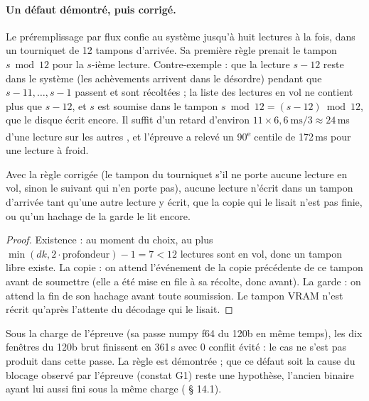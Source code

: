 \paragraph{Un défaut démontré, puis corrigé.} Le préremplissage par flux confie au système jusqu'à huit lectures à la fois, dans un tourniquet de 12 tampons d'arrivée. Sa première règle prenait le tampon $s \bmod 12$ pour la $s$-ième lecture. Contre-exemple : que la lecture $s - 12$ reste dans le système (les achèvements arrivent dans le désordre) pendant que $s - 11, \ldots, s - 1$ passent et sont récoltées ; la liste des lectures en vol ne contient plus que $s - 12$, et $s$ est soumise dans le tampon $s \bmod 12 = (s - 12) \bmod 12$, que le disque écrit encore. Il suffit d'un retard d'environ $11 \times 6{,}6~\text{ms}/3 \approx 24$\,ms d'une lecture sur les autres \calc, et l'épreuve a relevé un 90\textsuperscript{e} centile de 172\,ms pour une lecture à froid.

\begin{lemme}\label{lem:t2o-tampons}
Avec la règle corrigée (le tampon du tourniquet s'il ne porte aucune lecture en vol, sinon le suivant qui n'en porte pas), aucune lecture n'écrit dans un tampon d'arrivée tant qu'une autre lecture y écrit, que la copie qui le lisait n'est pas finie, ou qu'un hachage de la garde le lit encore.
\end{lemme}

\begin{proof}
Existence : au moment du choix, au plus $\min(dk, 2\cdot\text{profondeur}) - 1 = 7 < 12$ lectures sont en vol, donc un tampon libre existe. La copie : on attend l'événement de la copie précédente de ce tampon avant de soumettre (elle a été mise en file à sa récolte, donc avant). La garde : on attend la fin de son hachage avant toute soumission. Le tampon VRAM n'est récrit qu'après l'attente du décodage qui le lisait.
\end{proof}

Sous la charge de l'épreuve (sa passe numpy f64 du 120b en même temps), les dix fenêtres du 120b brut finissent en 361\,s avec 0 conflit évité : le cas ne s'est pas produit dans cette passe. La règle est démontrée ; que ce défaut soit la cause du blocage observé par l'épreuve (constat G1) reste une hypothèse, l'ancien binaire ayant lui aussi fini sous la même charge ( § 14.1).

